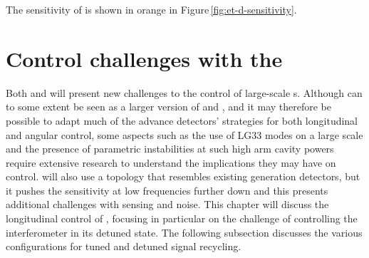 The sensitivity of \ETHF{} is shown in orange in Figure\,\ref{fig:et-d-sensitivity}.

\section{\label{sec:et-lf-control-challenges}Control challenges with the \ET{}}
Both \ETLF{} and \ETHF{} will present new challenges to the control of large-scale \DRFPMI{}s. Although \ETHF{} can to some extent be seen as a larger version of \ALIGO{} and \AVIRGO{}, and it may therefore be possible to adapt much of the advance detectors' strategies for both longitudinal and angular control, some aspects such as the use of LG33 modes on a large scale and the presence of parametric instabilities at such high arm cavity powers \cite{Evans2015} require extensive research to understand the implications they may have on control. \ETLF{} will also use a topology that resembles existing generation detectors, but it pushes the sensitivity at low frequencies further down and this presents additional challenges with sensing and noise. This chapter will discuss the longitudinal control of \ETLF{}, focusing in particular on the challenge of controlling the interferometer in its detuned state. The following subsection discusses the various configurations for tuned and detuned signal recycling.

